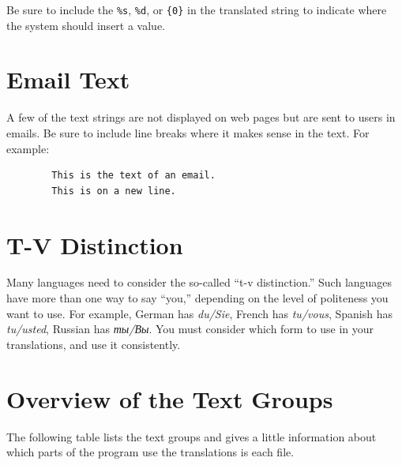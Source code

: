 \documentclass[11pt,oneside,a4paper]{memoir}
\begin{document}
Be sure to include the \verb|%s|, \verb|%d|, or \verb|{0}| in the translated string to indicate
where the system should insert a value.

\section{Email Text}\label{sec-email-text}

A few of the text strings are not displayed on web pages but are sent to users in emails. Be sure to
include line breaks where it makes sense in the text. For example:

\begin{verbatim}
        This is the text of an email.
        This is on a new line.
\end{verbatim}


\section{T-V Distinction}

Many languages need to consider the so-called ``t-v distinction.'' Such languages have more than one
way to say ``you,'' depending on the level of politeness you want to use. For example, German has
\emph{du/Sie}, French has \emph{tu/vous}, Spanish has \emph{tu/usted}, Russian has \emph{ты/Вы}. You
must consider which form to use in your translations, and use it consistently.


\section{Overview of the Text Groups}

The following table lists the text groups and gives a little information about which parts
of the program use the translations is each file.
\end{document}
